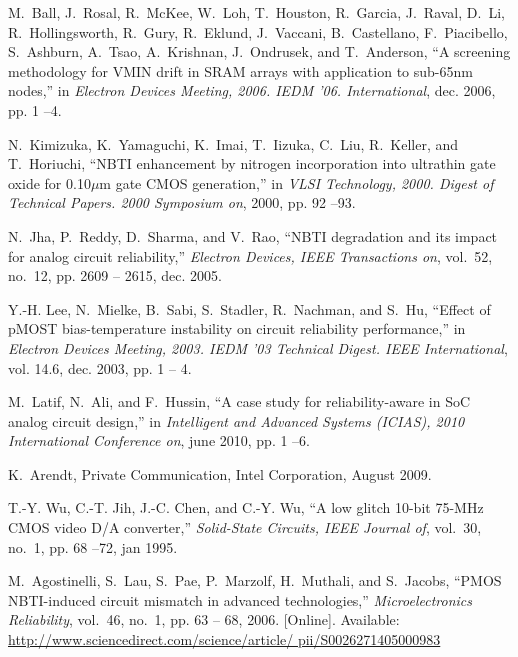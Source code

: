 \documentclass[11pt,a4paper]{article}
\begin{document}
\begin{thebibliography}{10}
M.~Ball, J.~Rosal, R.~McKee, W.~Loh, T.~Houston, R.~Garcia, J.~Raval, D.~Li,
  R.~Hollingsworth, R.~Gury, R.~Eklund, J.~Vaccani, B.~Castellano,
  F.~Piacibello, S.~Ashburn, A.~Tsao, A.~Krishnan, J.~Ondrusek, and
  T.~Anderson, ``A screening methodology for {VMIN} drift in {SRAM} arrays with
  application to sub-65nm nodes,'' in \emph{Electron Devices Meeting, 2006.
  IEDM '06. International}, dec. 2006, pp. 1 --4.

N.~Kimizuka, K.~Yamaguchi, K.~Imai, T.~Iizuka, C.~Liu, R.~Keller, and
  T.~Horiuchi, ``{NBTI} enhancement by nitrogen incorporation into ultrathin
  gate oxide for 0.10$\mu$m gate {CMOS} generation,'' in \emph{VLSI Technology,
  2000. Digest of Technical Papers. 2000 Symposium on}, 2000, pp. 92 --93.

N.~Jha, P.~Reddy, D.~Sharma, and V.~Rao, ``{NBTI} degradation and its impact
  for analog circuit reliability,'' \emph{Electron Devices, IEEE Transactions
  on}, vol.~52, no.~12, pp. 2609 -- 2615, dec. 2005.

Y.-H. Lee, N.~Mielke, B.~Sabi, S.~Stadler, R.~Nachman, and S.~Hu, ``Effect of
  {pMOST} bias-temperature instability on circuit reliability performance,'' in
  \emph{Electron Devices Meeting, 2003. IEDM '03 Technical Digest. IEEE
  International}, vol. 14.6, dec. 2003, pp. 1 -- 4.

M.~Latif, N.~Ali, and F.~Hussin, ``A case study for reliability-aware in {SoC}
  analog circuit design,'' in \emph{Intelligent and Advanced Systems (ICIAS),
  2010 International Conference on}, june 2010, pp. 1 --6.

K.~Arendt, Private Communication, Intel Corporation, August 2009.

T.-Y. Wu, C.-T. Jih, J.-C. Chen, and C.-Y. Wu, ``A low glitch 10-bit 75-{MHz}
  {CMOS} video {D/A} converter,'' \emph{Solid-State Circuits, IEEE Journal of},
  vol.~30, no.~1, pp. 68 --72, jan 1995.

\BIBentryALTinterwordspacing
M.~Agostinelli, S.~Lau, S.~Pae, P.~Marzolf, H.~Muthali, and S.~Jacobs, ``{PMOS
  NBTI}-induced circuit mismatch in advanced technologies,''
  \emph{Microelectronics Reliability}, vol.~46, no.~1, pp. 63 -- 68, 2006.
  [Online]. Available: \url{http://www.sciencedirect.com/science/article/
  pii/S0026271405000983}
\BIBentrySTDinterwordspacing

\end{thebibliography}
\end{document}
